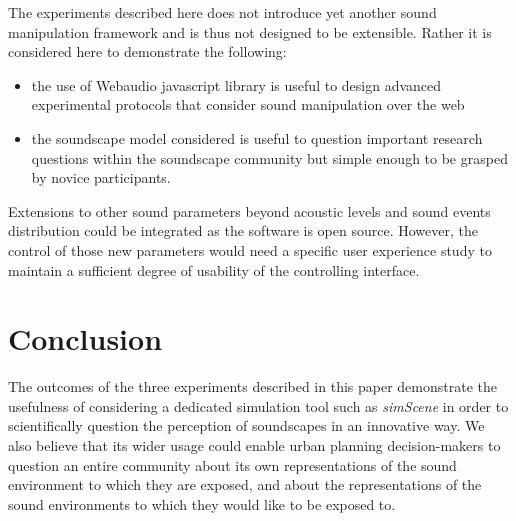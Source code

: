 \documentclass[12pt]{elsarticle}
\begin{document}
The experiments described here does not introduce yet another sound manipulation framework and is thus not designed to be extensible. Rather it is considered here to demonstrate the following:
\begin{itemize}
  \item the use of Webaudio javascript library is useful to design advanced experimental protocols that consider sound manipulation over the web
  \item the soundscape model considered is useful to question important research questions within the soundscape community  but simple enough to be grasped by novice participants.
\end{itemize}

Extensions to other sound parameters beyond acoustic levels and sound events distribution could be integrated as the software is open source. However, the control of those new parameters would need a specific user experience study to maintain a sufficient degree of usability of the controlling interface.


\section{Conclusion}


The outcomes of the three experiments described in this paper demonstrate the usefulness of considering a dedicated simulation tool such as \emph{simScene} in order to scientifically question the perception of soundscapes in an innovative way. We also believe that its wider usage could enable urban planning decision-makers to question an entire community about its own representations of the sound environment to which they are exposed, and about the representations of the sound environments to which they would like to be exposed to.

\end{document}
